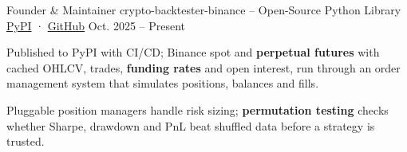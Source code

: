 \begin{cventries}
  \cventry
    {Founder \& Maintainer}
    {crypto-backtester-binance -- Open-Source Python Library}
    {\href{https://pypi.org/project/crypto-backtester-binance/}{PyPI} · \href{https://github.com/LevRoz630/crypto-backtester}{GitHub}}
    {Oct. 2025 -- Present}
    {
      \begin{cvitems}
        \item {Published to PyPI with CI/CD; Binance spot and \textbf{perpetual futures} with cached OHLCV, trades, \textbf{funding rates} and open interest, run through an order management system that simulates positions, balances and fills.}
        \item {Pluggable position managers handle risk sizing; \textbf{permutation testing} checks whether Sharpe, drawdown and PnL beat shuffled data before a strategy is trusted.}
      \end{cvitems}
    }
\end{cventries}
